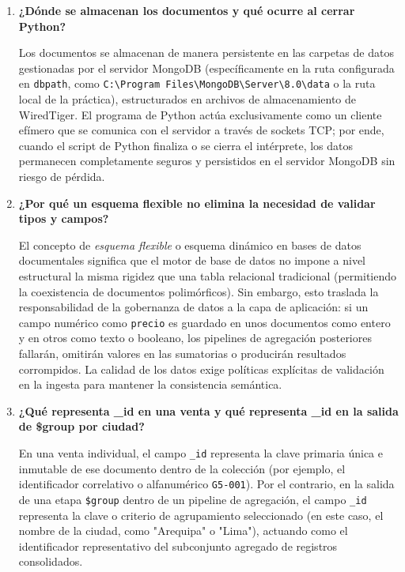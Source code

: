\documentclass[12pt,a4paper]{article}
\begin{document}
\begin{enumerate}
    \item \textbf{¿Dónde se almacenan los documentos y qué ocurre al cerrar Python?}
    
    Los documentos se almacenan de manera persistente en las carpetas de datos gestionadas por el servidor MongoDB (específicamente en la ruta configurada en \texttt{dbpath}, como \texttt{C:\textbackslash Program Files\textbackslash MongoDB\textbackslash Server\textbackslash 8.0\textbackslash data} o la ruta local de la práctica), estructurados en archivos de almacenamiento de WiredTiger. El programa de Python actúa exclusivamente como un cliente efímero que se comunica con el servidor a través de sockets TCP; por ende, cuando el script de Python finaliza o se cierra el intérprete, los datos permanecen completamente seguros y persistidos en el servidor MongoDB sin riesgo de pérdida.

    \item \textbf{¿Por qué un esquema flexible no elimina la necesidad de validar tipos y campos?}
    
    El concepto de \textit{esquema flexible} o esquema dinámico en bases de datos documentales significa que el motor de base de datos no impone a nivel estructural la misma rigidez que una tabla relacional tradicional (permitiendo la coexistencia de documentos polimórficos). Sin embargo, esto traslada la responsabilidad de la gobernanza de datos a la capa de aplicación: si un campo numérico como \texttt{precio} es guardado en unos documentos como entero y en otros como texto o booleano, los pipelines de agregación posteriores fallarán, omitirán valores en las sumatorias o producirán resultados corrompidos. La calidad de los datos exige políticas explícitas de validación en la ingesta para mantener la consistencia semántica.

    \item \textbf{¿Qué representa \_id en una venta y qué representa \_id en la salida de \$group por ciudad?}
    
    En una venta individual, el campo \texttt{\_id} representa la clave primaria única e inmutable de ese documento dentro de la colección (por ejemplo, el identificador correlativo o alfanumérico \texttt{G5-001}). Por el contrario, en la salida de una etapa \texttt{\$group} dentro de un pipeline de agregación, el campo \texttt{\_id} representa la clave o criterio de agrupamiento seleccionado (en este caso, el nombre de la ciudad, como "Arequipa" o "Lima"), actuando como el identificador representativo del subconjunto agregado de registros consolidados.


\end{enumerate}
\end{document}
